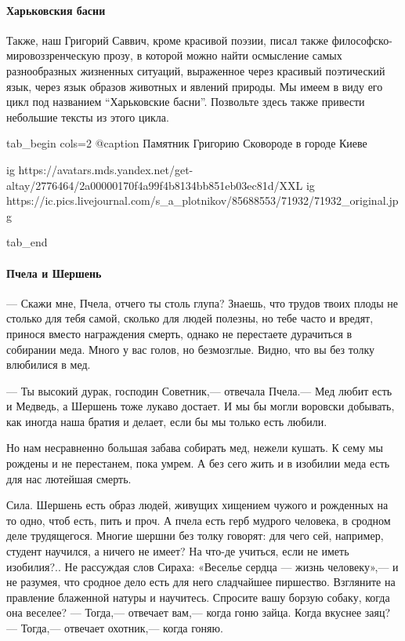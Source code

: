  
 
 
 
 

\paragraph{Харьковския басни}

Также, наш Григорий Саввич, кроме красивой поэзии, писал также философско-мировоззренческую
прозу, в которой можно найти осмысление самых разнообразных жизненных ситуаций,
выраженное через красивый поэтический язык, через язык образов животных и
явлений природы.  Мы имеем в виду его цикл под названием \enquote{Харьковские басни}.
Позвольте здесь также привести небольшие тексты из этого цикла.

\ifcmt
tab_begin cols=2
  @caption Памятник Григорию Сковороде в городе Киеве

  ig https://avatars.mds.yandex.net/get-altay/2776464/2a00000170f4a99f4b8134bb851eb03ec81d/XXL
  ig https://ic.pics.livejournal.com/s_a_plotnikov/85688553/71932/71932_original.jpg

tab_end
\fi

\paragraph{Пчела и Шершень}

— Скажи мне, Пчела, отчего ты столь глупа? Знаешь, что трудов твоих плоды не
столько для тебя самой, сколько для людей полезны, но тебе часто и вредят,
принося вместо награждения смерть, однако не перестаете дурачиться в собирании
меда. Много у вас голов, но безмозглые. Видно, что вы без толку влюбилися в
мед.

— Ты высокий дурак, господин Советник,— отвечала Пчела.— Мед любит есть и
Медведь, а Шершень тоже лукаво достает. И мы бы могли воровски добывать, как
иногда наша братия и делает, если бы мы только есть любили.

Но нам несравненно большая забава собирать мед, нежели кушать. К сему мы
рождены и не перестанем, пока умрем. А без сего жить и в изобилии меда есть для
нас лютейшая смерть.

Сила. Шершень есть образ людей, живущих хищением чужого и рожденных на то одно,
чтоб есть, пить и проч. А пчела есть герб мудрого человека, в сродном деле
трудящегося. Многие шершни без толку говорят: для чего сей, например, студент
научился, а ничего не имеет? На что-де учиться, если не иметь изобилия?.. Не
рассуждая слов Сираха: «Веселье сердца — жизнь человеку»,— и не разумея, что
сродное дело есть для него сладчайшее пиршество. Взгляните на правление
блаженной натуры и научитесь. Спросите вашу борзую собаку, когда она веселее? —
Тогда,— отвечает вам,— когда гоню зайца. Когда вкуснее заяц? — Тогда,— отвечает
охотник,— когда гоняю.

